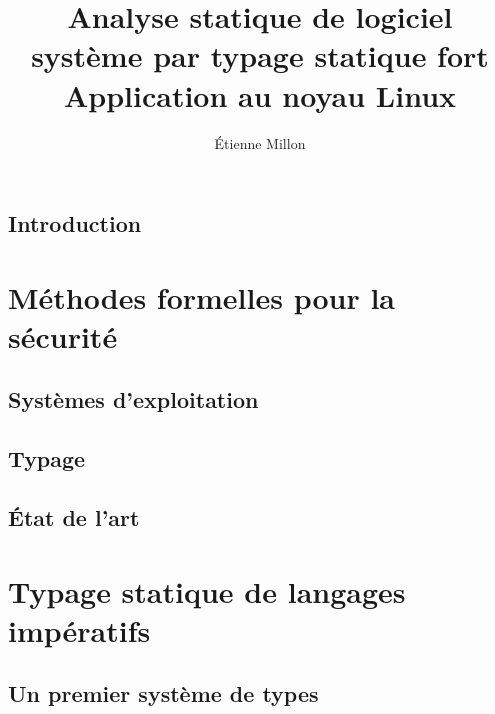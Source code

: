\documentclass[a4paper,11pt]{memoir}
\title{ \bfseries\LARGE Analyse statique de logiciel système par typage statique fort\\%
      {\mdseries\Large Application au noyau Linux}}
\author{Étienne Millon}
\begin{document}
\frontmatter

\maketitle

\cleartorecto

\asuabstract



\asuacknowledgements




\tableofcontents

\mainmatter

\chapter{Introduction}


\part{Méthodes formelles pour la sécurité}

\chapter{Systèmes d'exploitation}

\label{cha:os}


\chapter{Typage}



\chapter{État de l'art}



\part{Typage statique de langages impératifs}

\chapter{Un premier système de types}
\end{document}
